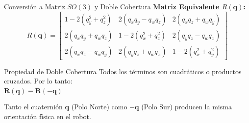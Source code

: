 \documentclass[aspectratio=169]{beamer}
\begin{document}
\begin{frame}{Conversión a Matriz $SO(3)$ y Doble Cobertura}
    \textbf{Matriz Equivalente $R(\mathbf{q})$:}
    \begin{equation*}
        R(\mathbf{q}) = \begin{bmatrix}      
        1 - 2(q_y^2 + q_z^2) & 2(q_x q_y - q_w q_z) & 2(q_x q_z + q_w q_y) \\      
        2(q_x q_y + q_w q_z) & 1 - 2(q_x^2 + q_z^2) & 2(q_y q_z - q_w q_x) \\      
        2(q_x q_z - q_w q_y) & 2(q_y q_z + q_w q_x) & 1 - 2(q_x^2 + q_y^2)      
        \end{bmatrix}
    \end{equation*}
    
    \vspace{0.2cm}
    \begin{alertblock}{Propiedad de Doble Cobertura}
        Todos los términos son cuadráticos o productos cruzados. Por lo tanto: \\
        \centering $\mathbf{R(\mathbf{q}) \equiv R(-\mathbf{q})}$
    \end{alertblock}
    Tanto el cuaternión $\mathbf{q}$ (Polo Norte) como $-\mathbf{q}$ (Polo Sur) producen la misma orientación física en el robot.
\end{frame}
\end{document}
